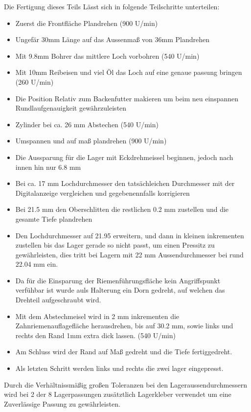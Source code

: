 Die Fertigung dieses Teils Lässt sich in folgende Teilschritte unterteilen:
\begin{itemize}
    \setlength\itemsep{0mm}
    \item Zuerst die Frontfläche Plandrehen (900 U/min)
    \item Ungefär 30mm Länge auf das Aussenmaß von 36mm Plandrehen
    \item Mit 9.8mm Bohrer das mittlere Loch vorbohren (540 U/min)
    \item Mit 10mm Reibeisen und viel Öl das Loch auf eine genaue passung bringen (260 U/min)
    \item Die Position Relativ zum Backenfutter makieren um beim neu einspannen Rundlaufgenauigkeit gewährzuleisten
    \item Zylinder bei ca. 26 mm Abstechen (540 U/min)
    \item Umspannen und auf maß plandrehen (900 U/min)
    \item Die Aussparung für die Lager mit Eckdrehmeissel beginnen, jedoch nach innen hin nur 6.8 mm 
    \item Bei ca. 17 mm Lochdurchmesser den tatsächleichen Durchmesser mit der Digitalanzeige vergleichen und gegebenennfalls korrigieren
    \item Bei 21.5 mm den Oberschlitten die restlichen 0.2 mm zustellen und die gesamte Tiefe plandrehen
    \item Den Lochdurchmesser auf 21.95 erweitern, und dann in kleinen inkrementen zustellen bis das Lager gerade so nicht passt, um einen Pressitz zu gewährleisten, dies tritt bei Lagern mit 22 mm Aussendurchmesser bei rund 22.04 mm ein.
    \item Da für die Einsparung der Riemenführungsfläche kein Angriffspunkt verfühbar ist wurde auls Halterung ein Dorn gedreht, auf welchen das Drehteil aufgeschraubt wird.
    \item Mit dem Abstechmeisel wird in 2 mm inkrementen die Zahnriemenauflagefläche herausdrehen, bis auf 30.2 mm, sowie links und rechts den Rand 1mm extra dick lassen. (540 U/min)
    \item Am Schluss wird der Rand auf Maß gedreht und die Tiefe fertiggedreht. 
    \item Als letzten Schritt werden links und rechts die zwei lager eingepresst.
\end{itemize}

    Durch die Verhältnissmäßig großen Toleranzen bei den Lageraussendurchmessern wird bei 2 der 8 Lagerpassungen zusätztlich Lagerkleber verwendet um eine Zuverlässige Passung zu gewährleisten.



